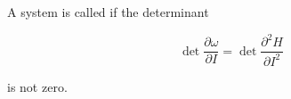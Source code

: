 A system is called  if the determinant

$$\det \frac{\partial \omega}{\partial I} = \det \frac{\partial^2 H}{\partial I^2}$$

is not zero.
